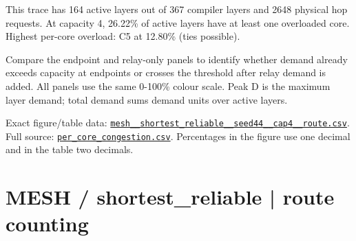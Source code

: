 \documentclass[10pt,a4paper]{article}
\begin{document}
This trace has 164 active layers out of 367 compiler layers and 2648 physical hop requests. At capacity 4, 26.22\% of active layers have at least one overloaded core. Highest per-core overload: C5 at 12.80\% (ties possible).\par
Compare the endpoint and relay-only panels to identify whether demand already exceeds capacity at endpoints or crosses the threshold after relay demand is added. All panels use the same 0-100\% colour scale. Peak D is the maximum layer demand; total demand sums demand units over active layers.\par
Exact figure/table data: \href{\detokenize{file:///home/dhruv-pansuriya/Documents/BTP/Compiler-Driven-ACE/output/pdf/qaoa_methods_congestion/tables/mesh__shortest_reliable__seed44__cap4__route.csv}}{\nolinkurl{mesh__shortest_reliable__seed44__cap4__route.csv}}. Full source: \href{\detokenize{file:///home/dhruv-pansuriya/Documents/BTP/Compiler-Driven-ACE/results/qaoa_2seed_2026-10-26/congestion/per_core_congestion.csv}}{\nolinkurl{per_core_congestion.csv}}. Percentages in the figure use one decimal and in the table two decimals.\par
\clearpage
\section*{MESH / shortest\_reliable | route counting}
\end{document}
